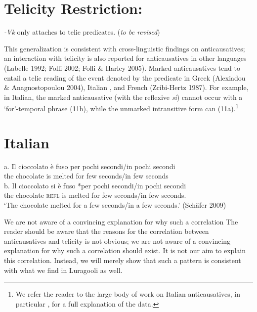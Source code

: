 \documentclass[output=paper]{langsci/langscibook}
\begin{document}
\begin{styleTabellenberschrift}
\chapter[Telicity Restriction:]{\textbf{Telicity Restriction}:}
\glt \textit{{}-Vk }only attaches to telic predicates. (\textit{to be revised})
\z

This generalization is consistent with cross-linguistic findings on anticausatives; an interaction with telicity is also reported for anticausatives in other languages (Labelle 1992; Folli 2002; Folli \& Harley 2005). Marked anticausatives tend to entail a telic reading of the event denoted by the predicate in Greek (Alexiadou \& Anagnostopoulou 2004), Italian \citep{Folli2002}, and French (Zribi-Hertz 1987). For example, in Italian, the marked anticausative (with the reflexive \textit{si}) cannot occur with a ‘for’-temporal phrase (11b), while the unmarked intransitive form can (11a).\footnote{ We refer the reader to the large body of work on Italian anticausatives, in particular \citet{Folli2002}, for a full explanation of the data.}

\chapter{Italian}
\gll a.  Il   cioccolato è  fuso     per pochi secondi/in pochi secondi\\
       the chocolate  is melted for few    seconds/in few    seconds\\
\gll b.  Il    cioccolato si     è  fuso     *per pochi secondi/in pochi secondi\\
       the chocolate  \textsc{refl} is melted  for   few   seconds/in few seconds. \\
\glt ‘The chocolate melted for a few seconds/in a few seconds.’     (Schäfer 2009)
\z

We are not aware of a convincing explanation for why such a correlation The reader should be aware that the reasons for the correlation between anticausatives%
%
%
 and telicity is not obvious; we are not aware of a convincing explanation for why such a correlation should exist. It is not our aim to explain this correlation. Instead, we will merely show that such a pattern is consistent with what we find in Luragooli as well. 


\end{styleTabellenberschrift}
\end{document}
